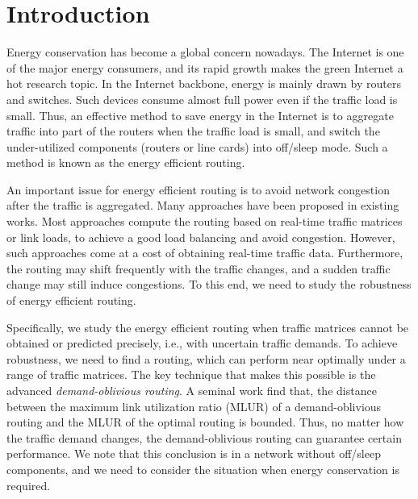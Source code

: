 \documentclass[conference]{IEEEtran}
\begin{document}
\IEEEpeerreviewmaketitle

\section{Introduction}

Energy conservation has become a global concern nowadays. The Internet is one of the major energy consumers, and its rapid growth makes the green Internet a hot research topic. In the Internet backbone, energy is mainly drawn by routers and switches. Such devices consume almost full power even if the traffic load is small. Thus, an effective method to save energy in the Internet is to aggregate traffic into part of the routers when the traffic load is small, and switch the under-utilized components (routers or line cards) into off/sleep mode. Such a method is known as the energy efficient routing.

An important issue for energy efficient routing is to avoid network congestion after the traffic is aggregated. Many approaches have been proposed in existing works. Most approaches compute the routing based on real-time traffic matrices or link loads, to achieve a good load balancing and avoid congestion. However, such approaches come at a cost of obtaining real-time traffic data. Furthermore, the routing may shift frequently with the traffic changes, and a sudden traffic change may still induce congestions. To this end, we need to study the robustness of energy efficient routing.

Specifically, we study the energy efficient routing when traffic matrices cannot be obtained or predicted precisely, i.e., with uncertain traffic demands. To achieve robustness, we need to find a routing, which can perform near optimally under a range of traffic matrices. The key technique that makes this possible is the advanced \emph{demand-oblivious routing}. A seminal work \cite{networking:oblivious} find that, the distance between the maximum link utilization ratio (MLUR) of a demand-oblivious routing and the MLUR of the optimal routing is bounded. Thus, no matter how the traffic demand changes, the demand-oblivious routing can guarantee certain performance. We note that this conclusion is in a network without off/sleep components, and we need to consider the situation when energy conservation is required.
\end{document}
